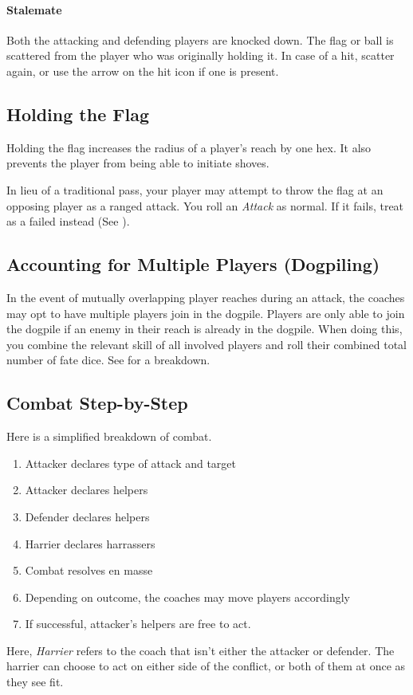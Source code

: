 \paragraph{Stalemate}
Both the attacking and defending players are knocked down.
The flag or ball is scattered from the player who was originally holding it.
In case of a hit, scatter again, or use the arrow on the hit icon if one is present.


\subsection{Holding the Flag}
Holding the flag increases the radius of a player's reach by one hex.
It also prevents the player from being able to initiate shoves.

In lieu of a traditional pass, your player may attempt to throw the flag at an opposing player as a ranged attack.
You roll an \textit{Attack} as normal.
If it fails, treat as a failed \throw{} instead (See ).

\subsection{Accounting for Multiple Players (Dogpiling)}\label{dogpiling}
In the event of mutually overlapping player reaches during an attack, the coaches may opt to have multiple players join in the dogpile.
Players are only able to join the dogpile if an enemy in their reach is already in the dogpile.
When doing this, you combine the relevant skill of all involved players and roll their combined total number of fate dice. 
See  for a breakdown.

\subsection{Combat Step-by-Step}\label{combat-step-by-step}
Here is a simplified breakdown of combat.
\begin{enumerate}
    \item Attacker declares type of attack and target
    \item Attacker declares helpers
    \item Defender declares helpers
    \item Harrier declares harrassers
    \item Combat resolves en masse
    \item Depending on outcome, the coaches may move players accordingly
    \item If successful, attacker's helpers are free to act.
\end{enumerate}

\begin{note}
Here, \textit{Harrier} refers to the coach that isn't either the attacker or defender. 
The harrier can choose to act on either side of the conflict, or both of them at once as they see fit.
\end{note}

